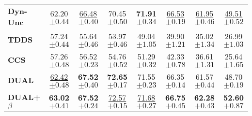 \begin{table}[ht]
\begin{tabular}{lccccccc}
    \textbf{Dyn-Unc} & 62.20 \scriptsize{$\pm 0.44$} & \underline{66.48} \scriptsize{$\pm 0.40 $} & 70.45 \scriptsize{$\pm 0.50 $} & \textbf{71.91} \scriptsize{$\pm 0.34 $} & \underline{66.53} \scriptsize{$\pm 0.19$} & \underline{61.95} \scriptsize{$\pm 0.46 $} & \underline{49.51} \scriptsize{$\pm 0.52$} \\
    
    \textbf{TDDS} & 57.24 \scriptsize{$\pm 0.44 $} & 55.64 \scriptsize{$\pm 0.46 $} & 53.97 \scriptsize{$\pm 0.46 $} & 49.04 \scriptsize{$\pm 1.05 $} & 39.90 \scriptsize{$\pm 1.21$} & 35.02 \scriptsize{$\pm 1.34 $} & 26.99 \scriptsize{$\pm 1.03$} \\
    
    \textbf{CCS} & 57.26 \scriptsize{$\pm 0.48 $} & 56.52 \scriptsize{$\pm 0.23 $} & 54.76 \scriptsize{$\pm 0.52 $} & 51.29 \scriptsize{$\pm 0.32 $} & 42.33 \scriptsize{$\pm 0.78 $} & 36.61 \scriptsize{$\pm 1.31 $} & 25.64 \scriptsize{$\pm 1.65 $} \\
    
    \midrule
    
    \textbf{DUAL} & \underline{62.42} \scriptsize{$\pm 0.48 $} & \textbf{67.52} \scriptsize{$\pm 0.40 $} & \textbf{72.65} \scriptsize{$\pm 0.17 $} & 71.55 \scriptsize{$\pm 0.23 $} & 66.35 \scriptsize{$\pm 0.14 $} & 61.57 \scriptsize{$\pm 0.44 $} & 48.70 \scriptsize{$\pm 0.19 $} \\
    
    \textbf{DUAL+$\beta$} & \textbf{63.02} \scriptsize{$\pm 0.41 $} & \textbf{67.52} \scriptsize{$\pm 0.24 $} & \underline{72.57} \scriptsize{$\pm 0.15 $} & \underline{71.68} \scriptsize{$\pm 0.27 $} & \textbf{66.75} \scriptsize{$\pm 0.45 $} & \textbf{62.28} \scriptsize{$\pm 0.43 $} & \textbf{52.60} \scriptsize{$\pm 0.87 $} \\
    
    \bottomrule
\end{tabular}
\end{table}





